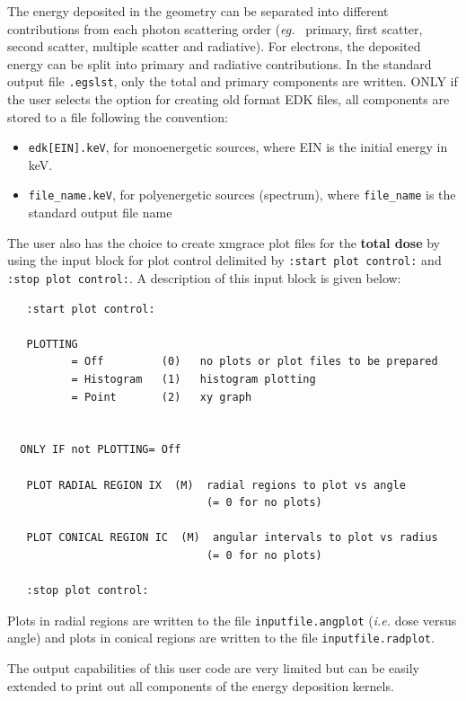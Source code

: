 \documentclass[12pt,twoside]{article}  %
\newcommand{\eg}{{\em eg.}}
\begin{document}
The energy deposited in the geometry can be separated into different
contributions from each photon scattering order (\eg~ primary,
first scatter, second scatter, multiple scatter and radiative). For
electrons, the deposited energy can be split into primary and radiative
contributions. In the standard output file {\tt *.egslst}, only the total
and primary components are written. ONLY if the user selects the option
for creating old format EDK files, all components are stored to a file
following the convention:
\begin{itemize}
\item {\tt edk[EIN].keV}, for monoenergetic sources,
where EIN is the initial energy in keV.
\item {\tt file\_name.keV}, for polyenergetic sources (spectrum),
where {\tt file\_name} is the standard output file name

\end{itemize}

The user also has the choice to
create xmgrace plot files for the {\bf total dose} by using the input block for plot control delimited by
{\tt :start plot control:} and {\tt:stop plot control:}. A description of this input block is
given below:

\begin{verbatim}
   :start plot control:

   PLOTTING
          = Off         (0)   no plots or plot files to be prepared
          = Histogram   (1)   histogram plotting
          = Point       (2)   xy graph


  ONLY IF not PLOTTING= Off

   PLOT RADIAL REGION IX  (M)  radial regions to plot vs angle
                               (= 0 for no plots)

   PLOT CONICAL REGION IC  (M)  angular intervals to plot vs radius
                               (= 0 for no plots)

   :stop plot control:
\end{verbatim}

Plots in radial regions are written to the file {\tt inputfile.angplot}
({\em i.e.} dose versus angle) and plots in conical regions are written
to the file {\tt inputfile.radplot}.

The output capabilities of this user code are very limited but can be
easily extended to print out all components of the energy deposition
kernels.

\typeout{}
\typeout{}
\renewcommand{\leftmark}{{REFERENCES}}
\renewcommand{\rightmark}{{REFERENCES}}
\end{document}
